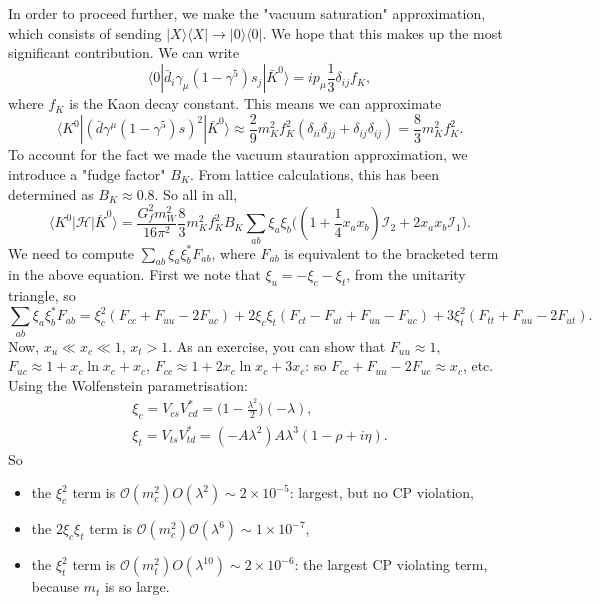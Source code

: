In order to proceed further, we make the "vacuum saturation" approximation, which consists of sending $|X\rangle \langle X| \to |0 \rangle \langle 0|$. We hope that this makes up the most significant contribution. We can write
\begin{equation}
\langle 0 | \bar{d}_i \gamma_\mu (1-\gamma^5)s_j | \bar{K}^0 \rangle = i p_\mu \frac{1}{3} \delta_{ij} f_K,
\end{equation}
where $f_K$ is the Kaon decay constant. This means we can approximate
\begin{equation}
\langle K^0 | (\bar{d}\gamma^\mu (1-\gamma^5)s)^2| \bar{K}^0 \rangle \approx \frac{2}{9} m_K^2 f_K^2 (\delta_{ii}\delta_{jj} + \delta_{ij}\delta_{ij}) = \frac{8}{3}m_K^2 f_K^2.
\end{equation}
To account for the fact we made the vacuum stauration approximation, we introduce a "fudge factor" $B_K$. From lattice calculations, this has been determined as $B_K \approx 0.8$. So all in all,
\begin{equation}
\langle K^0 | \mathcal{H} | \overline{K}^0 \rangle = \frac{G_f^2 m_W^2}{16\pi^2} \frac{8}{3}m_K^2 f_K^2 B_K \sum_{ab} \xi_a \xi_b \bigg( (1+\frac{1}{4} x_a x_b) \mathcal{I}_2 + 2 x_a x_b \mathcal{I}_1\bigg).
\end{equation}
We need to compute $\sum_{ab}\xi_a \xi_b^* F_{ab}$, where $F_{ab}$ is equivalent to the bracketed term in the above equation. First we note that $\xi_u = -\xi_c -\xi_t$, from the unitarity triangle, so
\begin{equation}
\sum_{ab} \xi_a \xi^*_b F_{ab} = \xi_c^2(F_{cc} + F_{uu} - 2F_{uc}) + 2 \xi_c \xi_t (F_{ct} - F_{ut} + F_{uu} - F_{uc}) + 3 \xi_t^2(F_{tt} + F_{uu} - 2 F_{ut}).
\end{equation}
Now, $x_u \ll x_c \ll 1$, $x_t >1$. As an exercise, you can show that $F_{uu} \approx 1$, $F_{uc} \approx 1 + x_c \ln x_c + x_c$,  $F_{cc} \approx 1 + 2x_c \ln x_c + 3x_c$: so $F_{cc} + F_{uu} -2F_{uc} \approx x_c$, etc. Using the Wolfenstein parametrisation:
\begin{equation}
\begin{split}
\xi_c = V_{cs}V_{cd}^* = \bigg(1-\frac{\lambda^2}{2}\bigg)(-\lambda), \\
\xi_t = V_{ts}V_{td}^* = (-A\lambda^2)A\lambda^3(1-\rho+i\eta).
\end{split}
\end{equation}
So 
\begin{itemize}
\item the $\xi_c^2$ term is $\mathcal{O}(m_c^2)O(\lambda^2) \sim 2 \times 10^{-5}$: largest, but no CP violation,
\item the $2\xi_c \xi_t$ term is $\mathcal{O}(m_c^2)\mathcal{O}(\lambda^6) \sim 1 \times 10^{-7}$,
\item the $\xi_t^2$ term is $\mathcal{O}(m_t^2)O(\lambda^10) \sim 2 \times 10^{-6}$: the largest CP violating term, because $m_t$ is so large.
\end{itemize}
